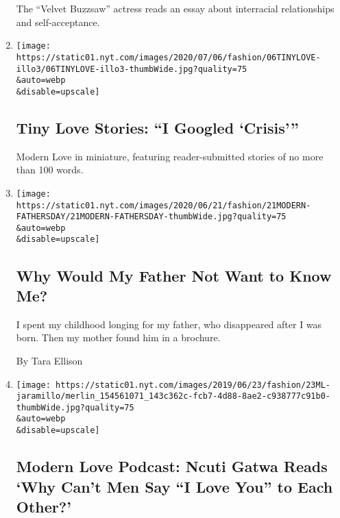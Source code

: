 \begin{enumerate}
  The ``Velvet Buzzsaw'' actress reads an essay about interracial
  relationships and self-acceptance.
\item
  \href{/2020/06/23/style/tiny-modern-love-stories-coronavirus-i-googled-crisis.html}{}

  \texttt{[image: https://static01.nyt.com/images/2020/07/06/fashion/06TINYLOVE-illo3/06TINYLOVE-illo3-thumbWide.jpg?quality=75\\\&auto=webp\\\&disable=upscale]}

  \hypertarget{tiny-love-stories-i-googled-crisis}{%
  \subsection{Tiny Love Stories: ``I Googled
  `Crisis'''}\label{tiny-love-stories-i-googled-crisis}}

  Modern Love in miniature, featuring reader-submitted stories of no
  more than 100 words.
\item
  \href{/2020/06/19/style/modern-love-coronavirus-missing-father.html}{}

  \texttt{[image: https://static01.nyt.com/images/2020/06/21/fashion/21MODERN-FATHERSDAY/21MODERN-FATHERSDAY-thumbWide.jpg?quality=75\\\&auto=webp\\\&disable=upscale]}

  \hypertarget{why-would-my-father-not-want-to-know-me}{%
  \subsection{Why Would My Father Not Want to Know
  Me?}\label{why-would-my-father-not-want-to-know-me}}

  I spent my childhood longing for my father, who disappeared after I
  was born. Then my mother found him in a brochure.

  By Tara Ellison
\item
  \href{/2020/06/17/style/modern-love-podcast-ncuti-gatwa.html}{}

  \texttt{[image: https://static01.nyt.com/images/2019/06/23/fashion/23ML-jaramillo/merlin\_154561071\_143c362c-fcb7-4d88-8ae2-c938777c91b0-thumbWide.jpg?quality=75\\\&auto=webp\\\&disable=upscale]}

  \hypertarget{modern-love-podcast-ncuti-gatwa-reads-why-cant-men-say-i-love-you-to-each-other}{%
  \subsection{Modern Love Podcast: Ncuti Gatwa Reads `Why Can't Men Say
  ``I Love You'' to Each
  Other?'}\label{modern-love-podcast-ncuti-gatwa-reads-why-cant-men-say-i-love-you-to-each-other}}


\end{enumerate}
